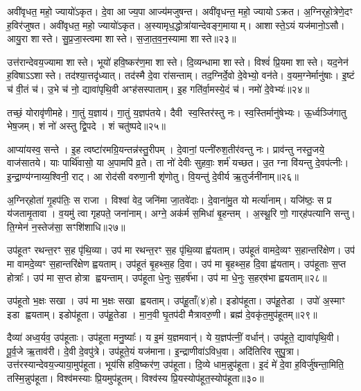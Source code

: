 अवी॑वृधत॒ महो॒ ज्यायो॑ऽकृत।
दे॒वा आज्य॒पा आज्य॑मजुषन्त।
अवी॑वृधन्त॒ महो॒ ज्यायो\-ऽक्रत।
अ॒ग्निर्‌\mbox{}हो॒त्रेणे॒दꣳ ह॒विर॑जुषत।
अवी॑वृधत॒ महो॒ ज्यायो॑ऽकृत।
अ॒स्यामृध॒द्धोत्रा॑यान्देवङ्ग॒मायाम्।
आशास्ते॒ऽयं यज॑मानो॒ऽसौ।
आयु॒रा शास्ते।
सु॒प्र॒जा॒स्त्वमा शास्ते।
स॒जा॒त॒व॒न॒स्यामा शास्ते॥२३॥

उत्त॑रान्देवय॒ज्यामा शास्ते।
भूयो॑ हवि॒ष्कर॑ण॒मा शास्ते।
दि॒व्यन्धामा शास्ते।
विश्वं॑ प्रि॒यमा शास्ते।
यद॒नेन॑ ह॒विषा\-ऽऽशास्ते।
तद॑श्या॒त्तदृ॑ध्यात्।
तद॑स्मै दे॒वा रा॑सन्ताम्।
तद॒ग्निर्दे॒वो दे॒वेभ्यो॒ वन॑ते।
व॒यम॒ग्नेर्मानु॑षाः।
इ॒ष्टं च॑ वी॒तं च॑।
उ॒भे च॑ नो॒ द्यावा॑पृथि॒वी अꣳह॑सस्पाताम्।
इ॒ह गति॑र्वा॒मस्ये॒दं च॑।
नमो॑ दे॒वेभ्यः॑॥२४॥\anuvakamend[अ॒भ॒यं॒ कृता॑वकृता॒ग्निरि॒दꣳ ह॒विर॑जुषत महे॒न्द्र इ॒दꣳ ह॒विर॑जुषत सजातवन॒स्यामा शास्ते वी॒तं च॒ त्रीणि॑ च]

तच्छं॒ योरावृ॑णीमहे।
गा॒तुं य॒ज्ञाय॑।
गा॒तुं य॒ज्ञप॑तये।
दैवी स्व॒स्तिर॑स्तु नः।
स्व॒स्तिर्मानु॑षेभ्यः।
ऊ॒र्ध्वञ्जि॑गातु भेष॒जम्।
शं नो॑ अस्तु द्वि॒पदे।
शं चतु॑ष्पदे॥२५॥\anuvakamend[तच्छं॒ योर॒ष्टौ]

आप्या॑यस्व॒ सन्ते।
इ॒ह त्वष्टा॑रमग्रि॒यन्तन्न॑स्तु॒रीपम्।
दे॒वानां॒ पत्नी॑रुश॒तीर॑वन्तु नः।
प्राव॑न्तु नस्तु॒जये॒ वाज॑सातये।
याः पार्थि॑वासो॒ या अ॒पामपि॑ व्र॒ते।
ता नो॑ देवीः सुहवाः॒ शर्म॑ यच्छत।
उ॒त ग्ना वि॑यन्तु दे॒वप॑त्नीः।
इ॒न्द्रा॒ण्य॑ग्नाय्य॒श्विनी॒ राट्।
आ रोद॑सी वरुणा॒नी शृ॑णोतु।
वि॒यन्तु॑ दे॒वीर्य ऋ॒तुर्जनी॑नाम्॥२६॥

अ॒ग्निर्‌\mbox{}होता॑ गृ॒हप॑तिः॒ स राजा।
विश्वा॑ वेद॒ जनि॑मा जा॒तवे॑दाः।
दे॒वाना॑मु॒त यो मर्त्या॑नाम्।
यजि॑ष्ठः॒ स प्र य॑जतामृ॒तावा।
व॒यमु॑ त्वा गृहपते॒ जना॑नाम्।
अग्ने॒ अक॑र्म स॒मिधा॑ बृ॒हन्तम्।
अ॒स्थू॒रि णो॒ गार्‌\mbox{}ह॑पत्यानि सन्तु।
ति॒ग्मेन॑ न॒स्तेज॑सा॒ सꣳशि॑शाधि॥२७॥\anuvakamend[जनी॑नाम॒ष्टौ च॑]

उप॑हूतꣳ रथन्त॒रꣳ स॒ह पृ॑थि॒व्या।
उप॑ मा रथन्त॒रꣳ स॒ह पृ॑थि॒व्या ह्व॑यताम्।
उप॑हूतं वामदे॒व्यꣳ स॒हान्तरि॑क्षेण।
उप॑ मा वामदे॒व्यꣳ स॒हान्तरि॑क्षेण ह्वयताम्।
उप॑हूतं बृ॒हथ्स॒ह दि॒वा।
उप॑ मा बृ॒हथ्स॒ह दि॒वा ह्व॑यताम्।
उप॑हूताः स॒प्त होत्राः᳚।
उप॑ मा स॒प्त होत्रा ह्वयन्ताम्।
उप॑हूता धे॒नुः स॒हर्ष॑भा।
उप॑ मा धे॒नुः स॒हर्‌\mbox{}ष॑भा ह्वयताम्॥२८॥

उप॑हूतो भ॒क्षः सखा।
उप॑ मा भ॒क्षः सखा ह्वयताम्।
उप॑हू॒ताँ(४)हो।
इडोप॑हूता।
उप॑हू॒तेडा।
उपो॑ अ॒स्माꣳ इडा ह्वयताम्।
इडोप॑हूता।
उप॑हू॒तेडा।
मा॒न॒वी घृ॒तप॑दी मैत्रावरु॒णी।
ब्रह्म॑ दे॒वकृ॑त॒मुप॑हूतम्॥२९॥

दैव्या॑ अध्व॒र्यव॒ उप॑हूताः।
उप॑हूता मनु॒ष्याः᳚।
य इ॒मं य॒ज्ञमवान्॑।
ये य॒ज्ञप॑त्नीं॒ वर्धान्॑।
उप॑हूते॒ द्यावा॑पृथि॒वी।
पू॒र्व॒जे ऋ॒ताव॑री।
दे॒वी दे॒वपु॑त्रे।
उप॑हूते॒यं यज॑माना।
इ॒न्द्राणीवा॑\-ऽविध॒वा।
अदि॑तिरिव सुपु॒त्रा।
उत्त॑रस्यान्देवय॒ज्याया॒मुप॑हूता।
भूय॑सि हवि॒ष्कर॑ण॒ उप॑हूता।
दि॒व्ये धाम॒न्नुप॑हूता।
इ॒दं मे॑ दे॒वा ह॒विर्जु॑षन्ता॒मिति॒ तस्मि॒न्नुप॑हूता।
विश्व॑मस्याः प्रि॒यमुप॑हूतम्।
विश्व॑स्य प्रि॒यस्योप॑हूत॒स्योप॑हूता॥३०॥




